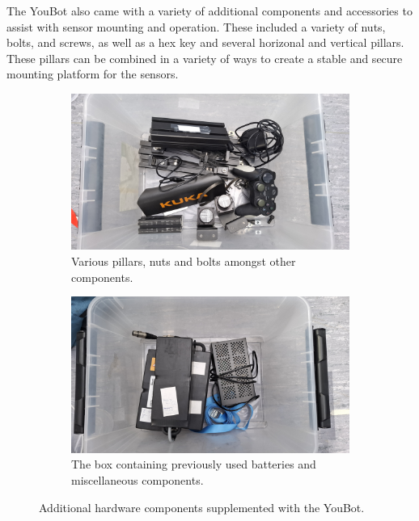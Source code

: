\documentclass[a4paper, 12pt]{article}
\newif\ifshownotes
\newcommand{\notes}[1]{\ifshownotes\textcolor{blue}{#1}\fi}
\begin{document}
    
    \notes{DESCRIBE THE INITIAL INSPECTION IN FULL HERE! TALK ABOUT THE PILLAR STUFF AND NUTS AND WHATNOT AS WELL!!!!}

    The YouBot also came with a variety of additional components and accessories to assist with sensor mounting and operation. These included a variety of nuts, bolts, and screws, as well as a hex key and several horizonal and vertical pillars. These pillars can be combined in a variety of ways to create a stable and secure mounting platform for the sensors. 

    \begin{figure}[ht]
        \centering
        \begin{subfigure}[t]{0.49\linewidth}
            \centering
            \includegraphics[width=\linewidth]{images/sec2/box2.jpg}
            \caption{Various pillars, nuts and bolts amongst other components.}
        \end{subfigure}
        \hfill
        \begin{subfigure}[t]{0.49\linewidth}
            \centering
            \includegraphics[width=\linewidth]{images/sec2/box1.jpg}
            \caption{The box containing previously used batteries and miscellaneous components.}
        \end{subfigure}
        \caption{Additional hardware components supplemented with the YouBot.}
    \end{figure}
\end{document}
